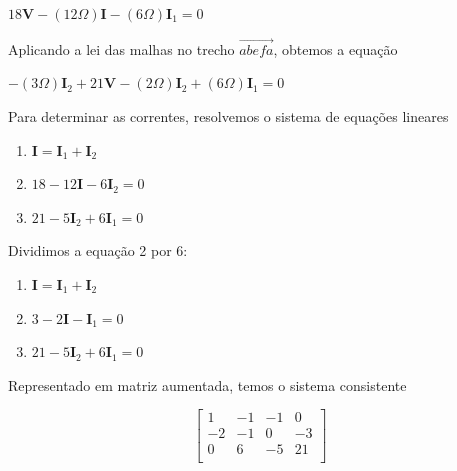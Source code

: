 \centerline{$18\mathbf{V} - (12\Omega)\mathbf{I} - (6\Omega)\mathbf{I}_1 = 0$}

Aplicando a lei das malhas no trecho $\overrightarrow{abefa}$, obtemos a equação

\centerline{$-(3\Omega)\mathbf{I}_2 + 21\mathbf{V} - (2\Omega)\mathbf{I}_2 + (6\Omega)\mathbf{I}_1 = 0$}

Para determinar as correntes, resolvemos o sistema de equações lineares

\begin{enumerate}
	\item $\mathbf{I} = \mathbf{I}_1 + \mathbf{I}_2$
	\item $18 - 12\mathbf{I} - 6\mathbf{I}_2 = 0$
	\item $21 - 5\mathbf{I}_2 + 6\mathbf{I}_1 = 0$
\end{enumerate}

Dividimos a equação 2 por 6:

\begin{enumerate}
	\item $\mathbf{I} = \mathbf{I}_1 + \mathbf{I}_2$
	\item $3 - 2\mathbf{I} - \mathbf{I}_1 = 0$
	\item $21 - 5\mathbf{I}_2 + 6\mathbf{I}_1 = 0$
\end{enumerate}

Representado em matriz aumentada, temos o sistema consistente

\[
\left[
\begin{array}{ccc|c}
	1 & -1 & -1 & 0\\
	-2 & -1 & 0 & -3\\
	0 & 6 & -5 & 21\\
\end{array}
\right]
\]


